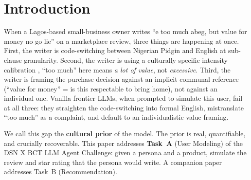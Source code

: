 \documentclass[sigconf,nonacm,balance]{acmart}
\begin{document}
\section{Introduction}

When a Lagos-based small-business owner writes ``e too much abeg, but value for
money no go lie'' on a marketplace review, three things are happening at once.
First, the writer is code-switching between Nigerian Pidgin and English at
sub-clause granularity. Second, the writer is using a culturally specific
intensity calibration , ``too much'' here means \emph{a lot of value}, not
\emph{excessive}. Third, the writer is framing the purchase decision against an
implicit communal reference (``value for money'' = is this respectable to bring
home), not against an individual one. Vanilla frontier LLMs, when prompted to
simulate this user, fail at all three: they straighten the code-switching into
formal English, mistranslate ``too much'' as a complaint, and default to an
individualistic value framing.

We call this gap the \textbf{cultural prior} of the model. The prior is real,
quantifiable, and  crucially  recoverable. This paper addresses
\textbf{Task~A} (User Modeling) of the DSN X BCT LLM Agent Challenge: given a
persona and a product, simulate the review and star rating that the persona
would write. A companion paper addresses Task~B (Recommendation).
\end{document}
